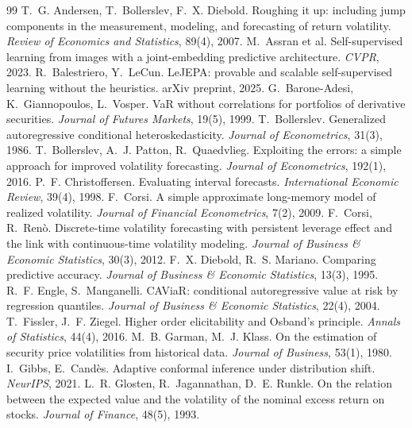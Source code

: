 \documentclass[11pt,a4paper]{article}
\begin{document}
\begin{thebibliography}{99}\small
{} T.~G. Andersen, T.~Bollerslev, F.~X. Diebold. Roughing it up: including jump components in the measurement, modeling, and forecasting of return volatility. \emph{Review of Economics and Statistics}, 89(4), 2007.
 M.~Assran et al. Self-supervised learning from images with a joint-embedding predictive architecture. \emph{CVPR}, 2023.
 R.~Balestriero, Y.~LeCun. LeJEPA: provable and scalable self-supervised learning without the heuristics. arXiv preprint, 2025.
 G.~Barone-Adesi, K.~Giannopoulos, L.~Vosper. VaR without correlations for portfolios of derivative securities. \emph{Journal of Futures Markets}, 19(5), 1999.
 T.~Bollerslev. Generalized autoregressive conditional heteroskedasticity. \emph{Journal of Econometrics}, 31(3), 1986.
 T.~Bollerslev, A.~J. Patton, R.~Quaedvlieg. Exploiting the errors: a simple approach for improved volatility forecasting. \emph{Journal of Econometrics}, 192(1), 2016.
 P.~F. Christoffersen. Evaluating interval forecasts. \emph{International Economic Review}, 39(4), 1998.
 F.~Corsi. A simple approximate long-memory model of realized volatility. \emph{Journal of Financial Econometrics}, 7(2), 2009.
 F.~Corsi, R.~Ren\`o. Discrete-time volatility forecasting with persistent leverage effect and the link with continuous-time volatility modeling. \emph{Journal of Business \& Economic Statistics}, 30(3), 2012.
 F.~X. Diebold, R.~S. Mariano. Comparing predictive accuracy. \emph{Journal of Business \& Economic Statistics}, 13(3), 1995.
 R.~F. Engle, S.~Manganelli. CAViaR: conditional autoregressive value at risk by regression quantiles. \emph{Journal of Business \& Economic Statistics}, 22(4), 2004.
 T.~Fissler, J.~F. Ziegel. Higher order elicitability and Osband's principle. \emph{Annals of Statistics}, 44(4), 2016.
 M.~B. Garman, M.~J. Klass. On the estimation of security price volatilities from historical data. \emph{Journal of Business}, 53(1), 1980.
 I.~Gibbs, E.~Cand\`es. Adaptive conformal inference under distribution shift. \emph{NeurIPS}, 2021.
 L.~R. Glosten, R.~Jagannathan, D.~E. Runkle. On the relation between the expected value and the volatility of the nominal excess return on stocks. \emph{Journal of Finance}, 48(5), 1993.

\end{thebibliography}
\end{document}
